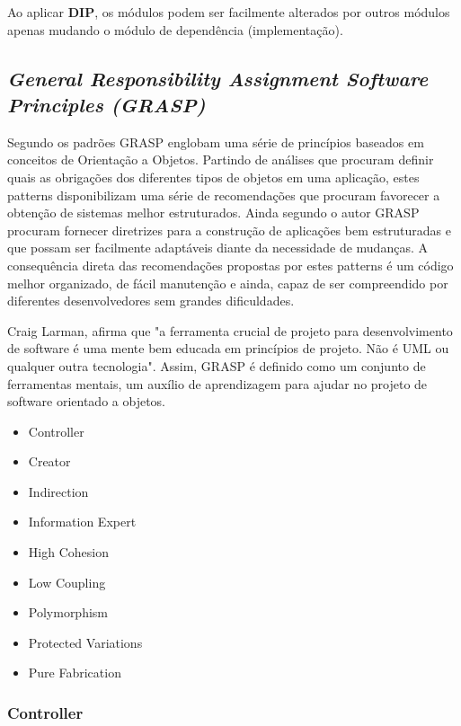 \documentclass[12pt]{article}
\begin{document}
Ao aplicar \textbf{DIP}, os módulos podem ser facilmente alterados por outros módulos apenas mudando o módulo de dependência (implementação).


\subsection{\textit{General Responsibility Assignment Software Principles (GRASP)}} \label{sec:grasp}

Segundo \cite{CRAIG_LARMAN} os padrões GRASP englobam uma série de princípios baseados em conceitos de Orientação a Objetos. Partindo de análises que procuram definir quais as obrigações dos diferentes tipos de objetos em uma aplicação, estes patterns disponibilizam uma série de recomendações que procuram favorecer a obtenção de sistemas melhor estruturados.
Ainda segundo o autor GRASP procuram fornecer diretrizes para a construção de aplicações bem estruturadas e que possam ser facilmente adaptáveis diante da necessidade de mudanças. A consequência direta das recomendações propostas por estes patterns é um código melhor organizado, de fácil manutenção e ainda, capaz de ser compreendido por diferentes desenvolvedores sem grandes dificuldades.

Craig Larman, afirma que "a ferramenta crucial de projeto para desenvolvimento de software é uma mente bem educada em princípios de projeto. Não é UML ou qualquer outra tecnologia". \cite{CRAIG_LARMAN} Assim, GRASP é definido como um conjunto de ferramentas mentais, um auxílio de aprendizagem para ajudar no projeto de software orientado a objetos.

\begin{itemize}
	\item Controller	
	\item Creator
	\item Indirection
	\item Information Expert
	\item High Cohesion
	\item Low Coupling
	\item Polymorphism
	\item Protected Variations
	\item Pure Fabrication
\end{itemize}


\subsubsection{Controller} \label{sec:grasp}
	
\end{document}
